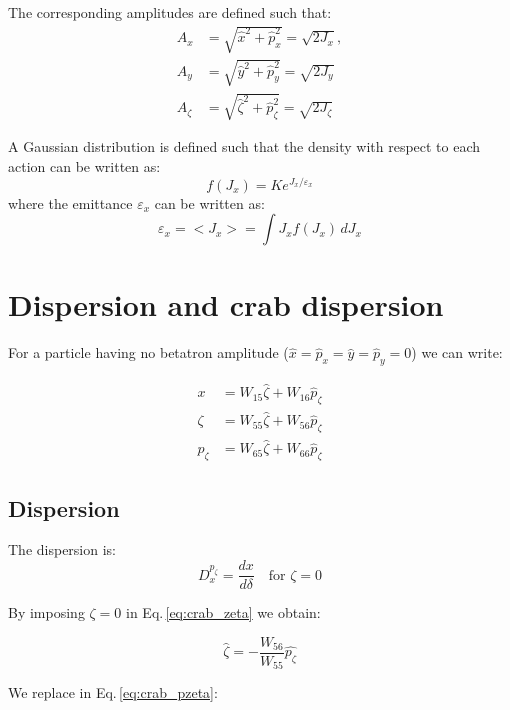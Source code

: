 The corresponding amplitudes are defined such that:
\begin{align}
A_x &= \sqrt{\hat{x}^2 + \hat{p}^2_x} = \sqrt{2J_x}, \label{eq:ampl_x}\\
A_y &= \sqrt{\hat{y}^2 + \hat{p}^2_y} = \sqrt{2J_y}\\
A_\zeta &= \sqrt{\hat{\zeta}^2 + \hat{p}^2_\zeta} = \sqrt{2J_\zeta}
\end{align}

A Gaussian distribution is defined such that the density with respect to each action can be written as:
\begin{equation}
f(J_x) = K e^{J_x/\varepsilon_x}
\end{equation}
where the emittance $\varepsilon_x$ can be written as:
\begin{equation}
\varepsilon_x = <J_x> = \int J_x f(J_x) \,dJ_x
\end{equation}


\section{Dispersion and crab dispersion}

For a particle having no betatron amplitude ($\hat{x} = \hat{p}_x =\hat{y} =\hat{p}_y=0$) we can write:

\begin{align}
x &= W_{15}\hat{\zeta} + W_{16}\hat{p}_\zeta \label{eq:crab_x}\\
\zeta &= W_{55}\hat{\zeta} + W_{56}\hat{p}_\zeta \label{eq:crab_zeta}\\
p_\zeta &= W_{65}\hat{\zeta} + W_{66}\hat{p}_\zeta \label{eq:crab_pzeta}
\end{align}


\subsection{Dispersion}
The dispersion is:
\begin{equation}
D_{x}^{p_\zeta} = \frac{dx}{d \delta} \quad \text{for } \zeta=0
\end{equation}

By imposing $\zeta = 0$ in Eq.\,\ref{eq:crab_zeta} we obtain:

\begin{equation}
\hat{\zeta} = - \frac{W_{56}}{W_{55}}\hat{p_\zeta}
\label{eq:crab_zeta_pzeta}
\end{equation}

We replace in Eq.\,\ref{eq:crab_pzeta}:

